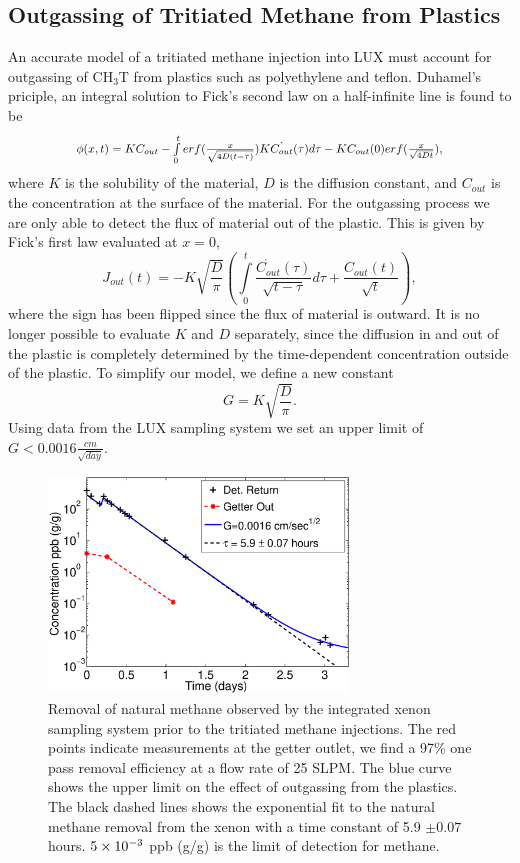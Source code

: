 \subsection{Outgassing of Tritiated Methane from Plastics}

\newcommand*{\Scale}[2][4]{\scalebox{#1}{$#2$}}%

An accurate model of a tritiated methane injection into LUX must account for outgassing of CH$_3$T from plastics such as polyethylene and teflon. Duhamel's priciple, an integral solution to Fick's second law on a half-infinite line is found to be
\[\Scale[0.85]{\phi (x,t) = KC_{out} - \int \limits_0^t erf(\frac{x}{\sqrt{4D(t - \tau)}})K\dot{C_{out}}(\tau)d\tau - KC_{out}(0)erf(\frac{x}{\sqrt{4Dt}}),}\]
where $K$ is the solubility of the material, $D$ is the diffusion constant, and $C_{out}$ is the concentration at the surface of the material. 
For the outgassing process we are only able to detect the flux of material out of the plastic.  This is given by Fick's first law evaluated at $x=0$,
\[J_{out}(t)= - K \sqrt{\frac{D}{\pi}}\left( \int \limits_0^t \frac{\dot{C_{out}}(\tau)}{\sqrt{t-\tau}} d \tau + \frac{C_{out}(t)}{\sqrt{t}}\right),\]
where the sign has been flipped since the flux of material is outward.  It is no longer possible to evaluate $K$ and $D$ separately, since the diffusion in and out of the plastic is completely determined by the time-dependent concentration outside of the plastic.  To simplify our model, we define a new constant
\[ G = K \sqrt{ \frac{D}{ \pi }} .\] Using data from the LUX sampling system we set an upper limit of $G<0.0016 \frac{cm}{\sqrt{day}}$. 

\begin{figure}[h!]\centering
\includegraphics[width=80mm]{July_CH4_wOG.eps}
\caption{Removal of natural methane observed by the integrated xenon sampling system prior to the tritiated methane injections. The red points indicate measurements at the getter outlet, we find a 97\% one pass removal efficiency at a flow rate of 25 SLPM. The blue curve shows the upper limit on the effect of outgassing from the plastics. The black dashed lines shows the exponential fit to the natural methane removal from the xenon with a time constant of 5.9 $\pm 0.07$ hours. $\rm 5\times10^{-3}$ ppb (g/g) is the limit of detection for methane.}
\label{fig:ch4_removal}
\end{figure}

